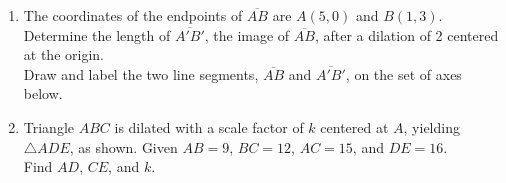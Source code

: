 \documentclass[12pt, twoside]{article}
\begin{document}
\begin{enumerate}
\newpage

\item The coordinates of the endpoints of $\overline{AB}$ are $A(5,0)$ and $B(1,3)$. Determine the length of $\overline{A'B'}$, the image of  $\overline{AB}$, after a dilation of 2 centered at the origin.\\[0.25cm]
Draw and label the two line segments,  $\overline{AB}$ and  $\overline{A'B'}$, on the set of axes below.
  \vspace{3cm}
  \begin{center}
  \end{center}

 \item Triangle $ABC$ is dilated with a scale factor of $k$ centered at $A$, yielding $\triangle ADE$, as shown. Given $AB=9$, $BC=12$, $AC=15$, and $DE=16$. \\[0.25cm] Find $AD$, $CE$, and $k$. \vspace{0.5cm}
 \begin{center}
   \end{center}

\end{enumerate}

\newpage
\end{document}
